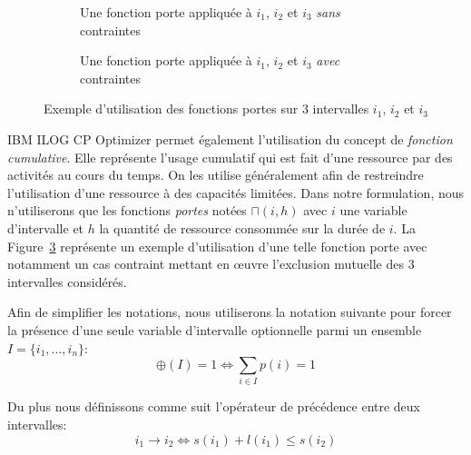 \documentclass[main.tex]{subfiles}
\begin{document}
\begin{figure}
    \centering
    \begin{subfigure}[b]{\linewidth}
        \centering
        \scalebox{0.9}{}
        \caption{Une fonction porte appliquée à $i_1$, $i_2$ et $i_3$ \emph{sans} contraintes}
        \label{fig_resumeFr_pulseFunctionNoConst}
    \end{subfigure}\vspace{5mm}
    \begin{subfigure}[b]{\linewidth}
        \centering
        \scalebox{0.9}{}
        \caption{Une fonction porte appliquée à $i_1$, $i_2$ et $i_3$ \emph{avec} contraintes}
        \label{fig_resumeFr_pulseFunctionWithConst}
    \end{subfigure}
    \caption{Exemple d'utilisation des fonctions portes sur 3 intervalles $i_1$, $i_2$ et $i_3$}
    \label{fig_resumeFr_pulseFunction}
\end{figure}

IBM ILOG CP Optimizer permet également l'utilisation du concept de \emph{fonction cumulative}. Elle représente l'usage cumulatif qui est fait d'une ressource par des activités au cours du temps. On les utilise généralement afin de restreindre l'utilisation d'une ressource à des capacités limitées. Dans notre formulation, nous n'utiliserons que les fonctions \emph{portes} notées $\sqcap(i, h)$ avec $i$ une variable d'intervalle et $h$ la quantité de ressource consommée sur la durée de $i$. La Figure~\ref{fig_resumeFr_pulseFunction} représente un exemple d'utilisation d'une telle fonction porte avec notamment un cas contraint mettant en \oe{}uvre l'exclusion mutuelle des 3 intervalles considérés. 

Afin de simplifier les notations, nous utiliserons la notation suivante pour forcer la présence d'une seule variable d'intervalle optionnelle parmi un ensemble $I = \{ i_1 , \ldots , i_n \}$:
        \begin{displaymath}
            \oplus(I)=1 \Leftrightarrow \underset{i \in I}{\sum} p(i) = 1
        \end{displaymath}

Du plus nous définissons comme suit l'opérateur de précédence entre deux intervalles:
        \begin{displaymath}
            i_1 \to i_2 \Leftrightarrow s(i_1) + l(i_1) \leq s(i_2)
        \end{displaymath}
\end{document}
